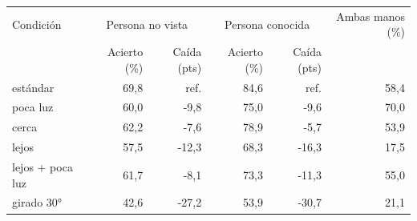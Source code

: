 \begin{tabular}{lrrrrr}
\toprule
Condición & \multicolumn{2}{c}{Persona no vista} & \multicolumn{2}{c}{Persona conocida} & Ambas manos (\%) \\
 & Acierto (\%) & Caída (pts) & Acierto (\%) & Caída (pts) & \\
\midrule
estándar & 69,8 & ref. & 84,6 & ref. & 58,4 \\
poca luz & 60,0 & -9,8 & 75,0 & -9,6 & 70,0 \\
cerca & 62,2 & -7,6 & 78,9 & -5,7 & 53,9 \\
lejos & 57,5 & -12,3 & 68,3 & -16,3 & 17,5 \\
lejos + poca luz & 61,7 & -8,1 & 73,3 & -11,3 & 55,0 \\
girado 30° & 42,6 & -27,2 & 53,9 & -30,7 & 21,1 \\
\bottomrule
\end{tabular}
